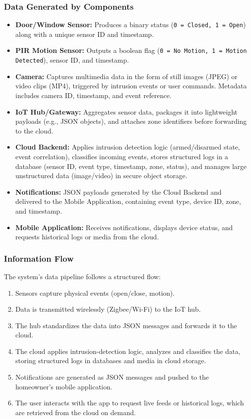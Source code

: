 \documentclass[conference]{IEEEtran}
\begin{document}
\subsubsection{Data Generated by Components}
\begin{itemize}
    \item \textbf{Door/Window Sensor:} Produces a binary status (\texttt{0 = Closed, 1 = Open}) along with a unique sensor ID and timestamp.
    \item \textbf{PIR Motion Sensor:} Outputs a boolean flag (\texttt{0 = No Motion, 1 = Motion Detected}), sensor ID, and timestamp.
    \item \textbf{Camera:} Captures multimedia data in the form of still images (JPEG) or video clips (MP4), triggered by intrusion events or user commands. Metadata includes camera ID, timestamp, and event reference.
    \item \textbf{IoT Hub/Gateway:} Aggregates sensor data, packages it into lightweight payloads (e.g., JSON objects), and attaches zone identifiers before forwarding to the cloud.
    \item \textbf{Cloud Backend:} Applies intrusion detection logic (armed/disarmed state, event correlation), classifies incoming events, stores structured logs in a database (sensor ID, event type, timestamp, zone, status), and manages large unstructured data (image/video) in secure object storage.
    \item \textbf{Notifications:} JSON payloads generated by the Cloud Backend and delivered to the Mobile Application, containing event type, device ID, zone, and timestamp.
    \item \textbf{Mobile Application:} Receives notifications, displays device status, and requests historical logs or media from the cloud.
\end{itemize}

\subsubsection{Information Flow}
The system’s data pipeline follows a structured flow: 
\begin{enumerate}
    \item Sensors capture physical events (open/close, motion).
    \item Data is transmitted wirelessly (Zigbee/Wi-Fi) to the IoT hub.
    \item The hub standardizes the data into JSON messages and forwards it to the cloud.
    \item The cloud applies intrusion-detection logic, analyzes and classifies the data, storing structured logs in databases and media in cloud storage.
    \item Notifications are generated as JSON messages and pushed to the homeowner’s mobile application.
    \item The user interacts with the app to request live feeds or historical logs, which are retrieved from the cloud on demand.
\end{enumerate}
\end{document}

